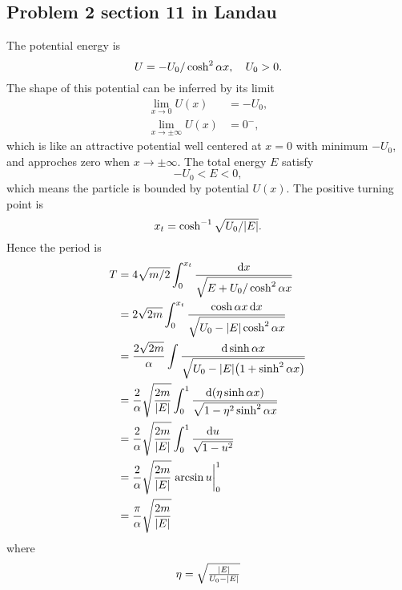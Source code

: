 \documentclass[10pt]{article}
\begin{document}
\subsection{Problem 2 section 11 in Landau}
The potential energy is
\begin{equation}
	U = -U_0/\cosh^2{\alpha x}\qc U_0 >0.
\end{equation}
The shape of this potential can be inferred by its limit
\begin{align*}
	\lim_{x \to 0} U(x) &= -U_0, \\
	\lim_{x \to \pm \infty} U(x) &= 0^-,
\end{align*}
which is like an attractive potential well centered at $x = 0$ with minimum $-U_0$, and approches zero when $x \to \pm \infty$.
The total energy $E$ satisfy
\begin{equation}
	-U_0 < E < 0,
\end{equation}
which means the particle is bounded by potential $U(x)$. The positive turning point is
\begin{equation}
	x_t = \cosh^{-1}{\sqrt{U_0/\abs{E}}}.
\end{equation}
Hence the period is
\begin{align*}
	T &= 4 \sqrt{m/2} \int_0^{x_t} \frac{\dd{x}}{\sqrt{E + U_0/\cosh^2{\alpha x}}} \\
	&= 2 \sqrt{2m} \int_0^{x_t} \frac{\cosh{\alpha x}\dd{x}}{\sqrt{U_0 - \abs{E} \cosh^2{\alpha x}}} \\
	&= \frac{2 \sqrt{2m}}{\alpha} \int \frac{\dd{\sinh{\alpha x}}}{\sqrt{U_0 - \abs{E}\qty(1+ \sinh^2{\alpha x})}} \\
	&= \frac{2}{\alpha} \sqrt{\frac{2m}{\abs{E}}} \int_0^1 \frac{\dd(\eta \sinh{\alpha x})}{\sqrt{1 - \eta^2\sinh^2{\alpha x}}} \\
	&= \frac{2}{\alpha} \sqrt{\frac{2m}{\abs{E}}} \int_0^1 \frac{\dd{u}}{\sqrt{1-u^2}} \\
	&= \frac{2 }{\alpha} \sqrt{\frac{2m}{\abs{E}}} \eval{\arcsin{u}}^1_0 \\
	&= \frac{\pi}{\alpha} \sqrt{\frac{2m}{\abs{E}}}
\end{align*}
where
\begin{equation}
	\eta = \sqrt{\tfrac{\abs{E}}{U_0 - \abs{E}}}
\end{equation}
\end{document}
